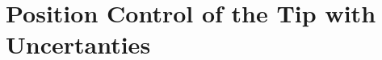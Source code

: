 \chapter{Position Control of the Tip with Uncertanties}
\label{cha:position_tip_uncertanties}






